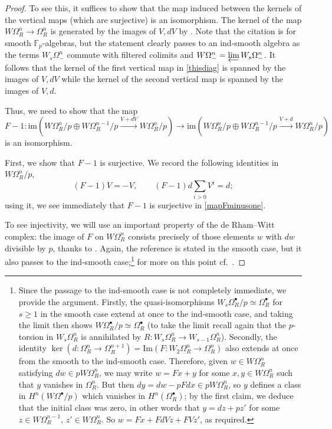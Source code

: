 \documentclass{amsart}
\theoremstyle{definition}
\newcommand{\xto}{\xrightarrow}
\begin{document}
\begin{proof}
To see this, it suffices to show that the map induced between the kernels of
the vertical maps (which are surjective) is an isomorphism. 
The kernel of the map $W \Omega^n_R \to \Omega^n_R$ is generated by the images
of $V, dV$ by \cite[Proposition
I.3.18]{illusie-derham-witt}.  Note that the citation is for smooth
$\mathbb{F}_p$-algebras, but the statement clearly passes to an ind-smooth
algebra as the terms $W_s \Omega^n_{-}$ commute with filtered colimits and $W
\Omega^n_{-} = \varprojlim W_s \Omega^n_{-}$. 
It follows that 
the kernel of the first vertical map in \eqref{thisdiag} is spanned by the
images of $V, dV$ while the kernel of the second vertical map is spanned by the
images of $V, d$. 

Thus, we need to show that the map
\begin{equation}
\label{mapFminusone}
F - 1: \mathrm{im}\left(W \Omega^n_{R}/p\oplus W \Omega^{n-1}_{R}/p\xto{V+dV} W \Omega^n_{R}/p\right) \to 
\mathrm{im}\left(W \Omega^n_{R}/p\oplus W \Omega^{n-1}_{R}/p \xto{V+d} W \Omega^n_{R}/p\right)
\end{equation} 
 is an isomorphism. 

First, we show that $F-1$ is surjective. 
We record the following identities in $W \Omega_R^n/p$,
\[(F-1)V=-V,\qquad (F-1)d\sum_{i>0}V^i=d;\]
using it, we see immediately that $F - 1$ is surjective in \eqref{mapFminusone}. 

To see injectivity, 
we will use an important property of the de Rham--Witt complex: the image of $F$ on
$W \Omega_R^n$ consists precisely of those elements $w$ with $dw$ divisible by
$p$, thanks to \cite[(I.3.21.1.5)]{illusie-derham-witt}. Again, the reference is stated in
the smooth case, but it also passes to the ind-smooth case;\footnote{Since the
passage to the ind-smooth case is not completely immediate, we provide the
argument. Firstly, the quasi-isomorphisms $W_s \Omega_R^\bullet/p\simeq
\Omega_R^{\bullet}$ for $s\ge1$ in the smooth case
\cite[Corol.~I.3.15]{illusie-derham-witt} extend at once to the ind-smooth case,
and taking the limit then shows $W \Omega_R^\bullet/p\simeq \Omega_R^\bullet$
(to take the limit recall again that the $p$-torsion in $W_s\Omega^n_R$ is
annihilated by $R:W_s\Omega^n_R\to W_{s-1}\Omega^n_R$). Secondly, the identity
$\ker(d \colon \Omega^n_R\to\Omega^{n+1}_R)=\mathrm{Im}( F \colon
W_2\Omega^n_R\to \Omega^n_R)$ also extends at once from the smooth
\cite[Prop.~I.3.21]{illusie-derham-witt} to the ind-smooth case. Therefore,
given $w\in W\Omega^n_R$ satisfying $dw\in pW\Omega^n_R$, we may write $w=Fx+y$
for some $x,y\in W\Omega^n_R$ such that $y$ vanishes in $\Omega^n_R$. But then
$dy=dw-pFdx\in pW\Omega^n_R$, so $y$ defines a class in $H^n(W\Omega^\bullet/p)$
which vanishes in $H^n(\Omega^\bullet_R)$; by the first claim, we deduce that
the initial class was zero, in other words that $y=dz+pz'$ for some $z\in
W\Omega^{n-1}_R$, $z'\in W\Omega^n_R$. So $w= Fx+FdVz+FVz'$, as required.} for more on this
point cf.~\cite[Sec.~2]{BLM}. 


\end{proof}
\end{document}
